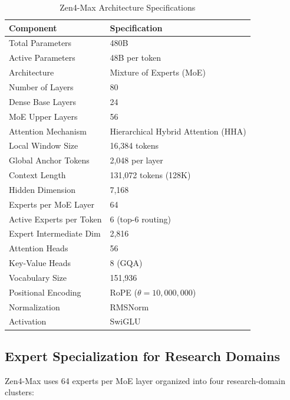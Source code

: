 \documentclass[11pt,a4paper]{article}
\begin{document}
\begin{table}[H]
\centering
\begin{tabular}{ll}
\toprule
\textbf{Component} & \textbf{Specification} \\
\midrule
Total Parameters          & 480B \\
Active Parameters         & 48B per token \\
Architecture              & Mixture of Experts (MoE) \\
Number of Layers          & 80 \\
Dense Base Layers         & 24 \\
MoE Upper Layers          & 56 \\
Attention Mechanism       & Hierarchical Hybrid Attention (HHA) \\
Local Window Size         & 16,384 tokens \\
Global Anchor Tokens      & 2,048 per layer \\
Context Length            & 131,072 tokens (128K) \\
Hidden Dimension          & 7,168 \\
Experts per MoE Layer     & 64 \\
Active Experts per Token  & 6 (top-6 routing) \\
Expert Intermediate Dim   & 2,816 \\
Attention Heads           & 56 \\
Key-Value Heads           & 8 (GQA) \\
Vocabulary Size           & 151,936 \\
Positional Encoding       & RoPE ($\theta = 10{,}000{,}000$) \\
Normalization             & RMSNorm \\
Activation                & SwiGLU \\
\bottomrule
\end{tabular}
\caption{Zen4-Max Architecture Specifications}
\end{table}

\subsection{Expert Specialization for Research Domains}

Zen4-Max uses 64 experts per MoE layer organized into four research-domain clusters:
\end{document}
